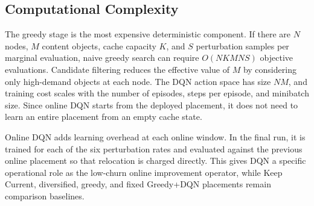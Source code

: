 \subsection{Computational Complexity}

The greedy stage is the most expensive deterministic component. If there are \(N\) nodes, \(M\) content objects, cache capacity \(K\), and \(S\) perturbation samples per marginal evaluation, naive greedy search can require \(O(NKMNS)\) objective evaluations. Candidate filtering reduces the effective value of \(M\) by considering only high-demand objects at each node. The DQN action space has size \(NM\), and training cost scales with the number of episodes, steps per episode, and minibatch size. Since online DQN starts from the deployed placement, it does not need to learn an entire placement from an empty cache state.

Online DQN adds learning overhead at each online window. In the final run, it is trained for each of the six perturbation rates and evaluated against the previous online placement so that relocation is charged directly. This gives DQN a specific operational role as the low-churn online improvement operator, while Keep Current, diversified, greedy, and fixed Greedy+DQN placements remain comparison baselines.
